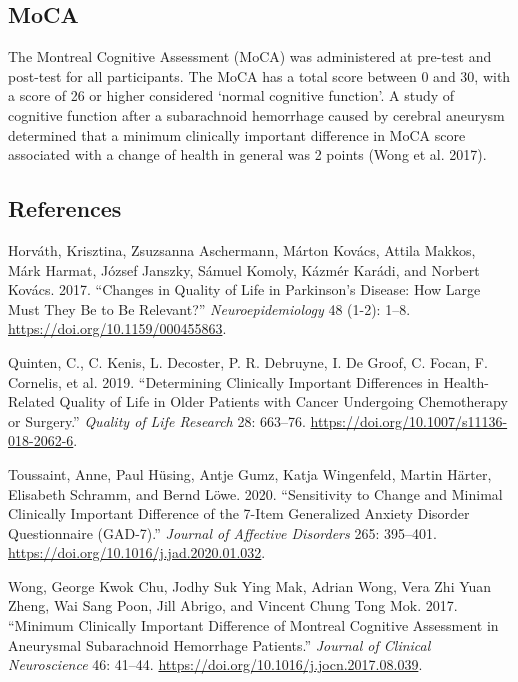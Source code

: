 \documentclass[
]{article}
\newlength{\cslhangindent}
\newlength{\cslentryspacingunit} %
\newenvironment{CSLReferences}[2] %
 {%
  \setlength{\parindent}{0pt}
  \ifodd #1
  \let\oldpar\par
  \def\par{\hangindent=\cslhangindent\oldpar}
  \fi
  \setlength{\parskip}{#2\cslentryspacingunit}
 }%
 {}
\begin{document}
\hypertarget{moca}{%
\subsection{MoCA}\label{moca}}

The Montreal Cognitive Assessment (MoCA) was administered at pre-test
and post-test for all participants. The MoCA has a total score between 0
and 30, with a score of 26 or higher considered `normal cognitive
function'. A study of cognitive function after a subarachnoid hemorrhage
caused by cerebral aneurysm determined that a minimum clinically
important difference in MoCA score associated with a change of health in
general was 2 points (Wong et al. 2017).

\hypertarget{references}{%
\subsection*{References}\label{references}}

\hypertarget{refs}{}
\begin{CSLReferences}{1}{0}
\leavevmode{}%
Horváth, Krisztina, Zsuzsanna Aschermann, Márton Kovács, Attila Makkos,
Márk Harmat, József Janszky, Sámuel Komoly, Kázmér Karádi, and Norbert
Kovács. 2017. {``{Changes in Quality of Life in Parkinson's Disease: How
Large Must They Be to Be Relevant?}''} \emph{Neuroepidemiology} 48
(1-2): 1--8. \url{https://doi.org/10.1159/000455863}.

\leavevmode{}%
Quinten, C., C. Kenis, L. Decoster, P. R. Debruyne, I. De Groof, C.
Focan, F. Cornelis, et al. 2019. {``Determining Clinically Important
Differences in Health-Related Quality of Life in Older Patients with
Cancer Undergoing Chemotherapy or Surgery.''} \emph{Quality of Life
Research} 28: 663--76. \url{https://doi.org/10.1007/s11136-018-2062-6}.

\leavevmode{}%
Toussaint, Anne, Paul Hüsing, Antje Gumz, Katja Wingenfeld, Martin
Härter, Elisabeth Schramm, and Bernd Löwe. 2020. {``Sensitivity to
Change and Minimal Clinically Important Difference of the 7-Item
Generalized Anxiety Disorder Questionnaire (GAD-7).''} \emph{Journal of
Affective Disorders} 265: 395--401.
\url{https://doi.org/10.1016/j.jad.2020.01.032}.

\leavevmode{}%
Wong, George Kwok Chu, Jodhy Suk Ying Mak, Adrian Wong, Vera Zhi Yuan
Zheng, Wai Sang Poon, Jill Abrigo, and Vincent Chung Tong Mok. 2017.
{``Minimum Clinically Important Difference of Montreal Cognitive
Assessment in Aneurysmal Subarachnoid Hemorrhage Patients.''}
\emph{Journal of Clinical Neuroscience} 46: 41--44.
\url{https://doi.org/10.1016/j.jocn.2017.08.039}.

\end{CSLReferences}
\end{document}

